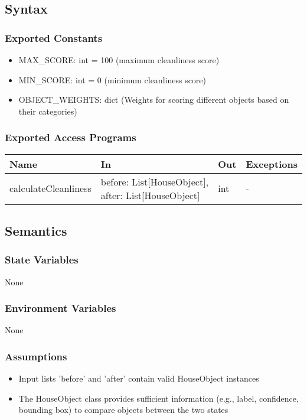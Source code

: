 \documentclass[12pt, titlepage]{article}
\begin{document}
\subsection{Syntax}

\subsubsection{Exported Constants}

\begin{itemize}
  \item MAX{\_}SCORE: int = 100 (maximum cleanliness score)
  \item MIN{\_}SCORE: int = 0 (minimum cleanliness score)
  \item OBJECT{\_}WEIGHTS: dict (Weights for scoring different objects based on their categories)
\end{itemize}

\subsubsection{Exported Access Programs}

\begin{center}
\begin{tabular}{p{4cm} p{5cm} p{3cm} p{3.5cm}}
\hline
\textbf{Name} & \textbf{In} & \textbf{Out} & \textbf{Exceptions} \\
\hline
calculateCleanliness & before: List[HouseObject], after: List[HouseObject] & int & - \\
\hline
\end{tabular}
\end{center}

\subsection{Semantics}

\subsubsection{State Variables}
None

\subsubsection{Environment Variables}
None

\subsubsection{Assumptions}
\begin{itemize}
  \item Input lists 'before' and 'after' contain valid HouseObject instances
  \item The HouseObject class provides sufficient information (e.g., label, confidence, bounding box) to compare objects between the two states
\end{itemize}
\end{document}
